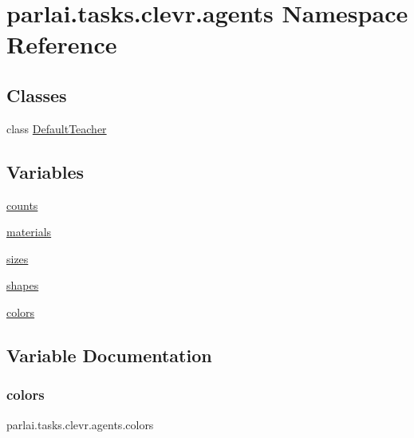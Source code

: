 \hypertarget{namespaceparlai_1_1tasks_1_1clevr_1_1agents}{}\section{parlai.\+tasks.\+clevr.\+agents Namespace Reference}
\label{namespaceparlai_1_1tasks_1_1clevr_1_1agents}
\subsection*{Classes}
\begin{DoxyCompactItemize}
\item 
class \hyperlink{classparlai_1_1tasks_1_1clevr_1_1agents_1_1DefaultTeacher}{Default\+Teacher}
\end{DoxyCompactItemize}
\subsection*{Variables}
\begin{DoxyCompactItemize}
\item 
\hyperlink{namespaceparlai_1_1tasks_1_1clevr_1_1agents_a60ab10443eafc8e7f18b4135037144bc}{counts}
\item 
\hyperlink{namespaceparlai_1_1tasks_1_1clevr_1_1agents_afb28d348eb18b0cba67d7fdd371e777a}{materials}
\item 
\hyperlink{namespaceparlai_1_1tasks_1_1clevr_1_1agents_a06906df11cf53e342b7665a036bc1b37}{sizes}
\item 
\hyperlink{namespaceparlai_1_1tasks_1_1clevr_1_1agents_a426ebeee1a6c1321bdbcd20ff4ca730e}{shapes}
\item 
\hyperlink{namespaceparlai_1_1tasks_1_1clevr_1_1agents_aadad1eb760d83c337b67c1c95fb2dcfa}{colors}
\end{DoxyCompactItemize}


\subsection{Variable Documentation}
\mbox{\label{namespaceparlai_1_1tasks_1_1clevr_1_1agents_aadad1eb760d83c337b67c1c95fb2dcfa}} 
\subsubsection{\texorpdfstring{colors}{colors}}
{\footnotesize\ttfamily parlai.\+tasks.\+clevr.\+agents.\+colors}



